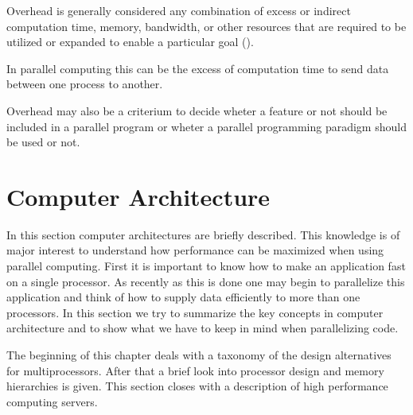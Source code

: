 Overhead is generally considered any combination of excess or indirect
computation time, memory, bandwidth, or other
resources that are required to be utilized or expanded to enable a
particular goal (\cite{wiki:overhead}).

In parallel computing this can be the excess of computation time to
send data between one process to another.

Overhead may also be a criterium to decide wheter a feature or not
should be included in a parallel program or wheter a parallel
programming paradigm should be used or not.

\section{Computer Architecture}

In this section computer architectures are briefly described. This
knowledge is of major interest to
understand how performance can be maximized when using parallel
computing. First it is important to know how to make an application fast
on a single processor. As recently as this is done one may begin to
parallelize this application and think of how to supply data efficiently to
more than one processors. In this section we try to summarize the key
concepts in computer architecture and to show what we have to keep in
mind when parallelizing code.

The beginning of this chapter deals with a taxonomy of
the design alternatives for multiprocessors. After that a brief look
into processor design and memory hierarchies is given. This section
closes with a description of high performance computing servers.

